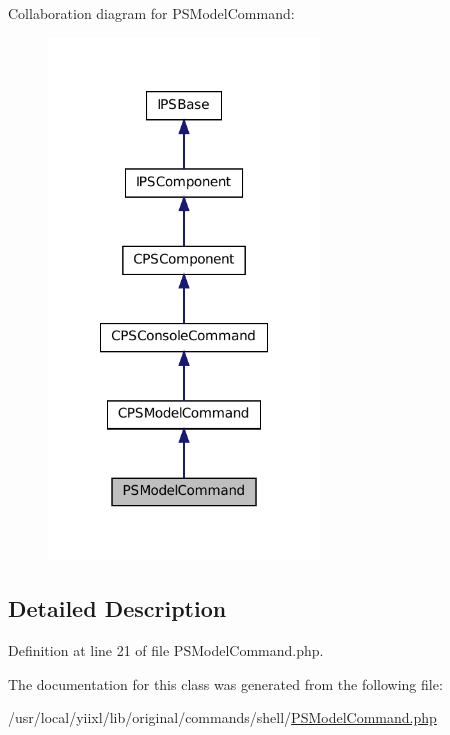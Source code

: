 Collaboration diagram for PSModelCommand:\nopagebreak
\begin{figure}[H]
\begin{center}
\leavevmode
\includegraphics[width=204pt]{classPSModelCommand__coll__graph}
\end{center}
\end{figure}


\subsection{Detailed Description}


Definition at line 21 of file PSModelCommand.php.



The documentation for this class was generated from the following file:\begin{DoxyCompactItemize}
\item 
/usr/local/yiixl/lib/original/commands/shell/\hyperlink{PSModelCommand_8php}{PSModelCommand.php}\end{DoxyCompactItemize}
